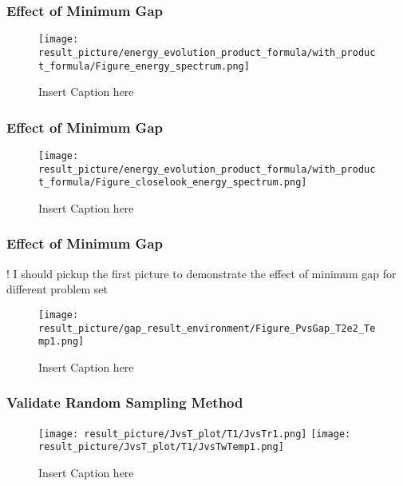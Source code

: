 \documentclass{beamer}
\begin{document}
\begin{frame}
	\frametitle{Effect of Minimum Gap}
	\begin{figure}
		\centering
		\texttt{[image: result\_picture/energy\_evolution\_product\_formula/with\_product\_formula/Figure\_energy\_spectrum.png]}
		
		\caption{Insert Caption here}
	\end{figure}
\end{frame}

\begin{frame}
	\frametitle{Effect of Minimum Gap}
	\begin{figure}
		\centering
		\texttt{[image: result\_picture/energy\_evolution\_product\_formula/with\_product\_formula/Figure\_closelook\_energy\_spectrum.png]}
		
		\caption{Insert Caption here}
	\end{figure}
\end{frame}

\begin{frame}
	\frametitle{Effect of Minimum Gap}
	! I should pickup the first picture to demonstrate the effect of minimum gap for different problem set
	\begin{figure}
		\centering
		\texttt{[image: result\_picture/gap\_result\_environment/Figure\_PvsGap\_T2e2\_Temp1.png]}
		
		\caption{Insert Caption here}
	\end{figure}
\end{frame}

\begin{frame}
	\frametitle{Validate Random Sampling Method}
	\begin{figure}
		\centering
		\texttt{[image: result\_picture/JvsT\_plot/T1/JvsTr1.png]}
		\hfill
		\texttt{[image: result\_picture/JvsT\_plot/T1/JvsTwTemp1.png]}		
		
		\caption{Insert Caption here}
	\end{figure}
\end{frame}
\end{document}
